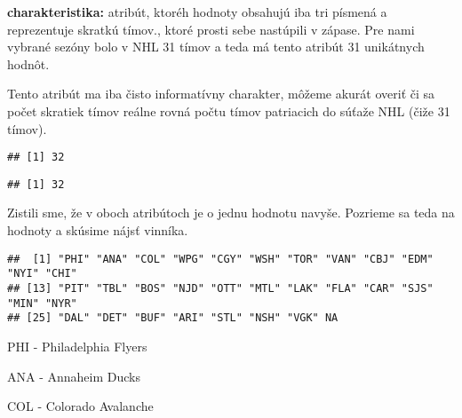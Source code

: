 \documentclass[
]{article}
\newenvironment{Shaded}{\begin{snugshade}}{\end{snugshade}}
\newcommand{\FunctionTok}[1]{\textcolor[rgb]{0.00,0.00,0.00}{#1}}
\newcommand{\NormalTok}[1]{#1}
\newcommand{\SpecialCharTok}[1]{\textcolor[rgb]{0.00,0.00,0.00}{#1}}
\begin{document}
\textbf{charakteristika:} atribút, ktoréh hodnoty obsahujú iba tri
písmená a reprezentuje skratkú tímov., ktoré prosti sebe nastúpili v
zápase. Pre nami vybrané sezóny bolo v NHL 31 tímov a teda má tento
atribút 31 unikátnych hodnôt.

Tento atribút ma iba čisto informatívny charakter, môžeme akurát overiť
či sa počet skratiek tímov reálne rovná počtu tímov patriacich do súťaže
NHL (čiže 31 tímov).

\begin{Shaded}
\end{Shaded}

\begin{verbatim}
## [1] 32
\end{verbatim}

\begin{Shaded}
\end{Shaded}

\begin{verbatim}
## [1] 32
\end{verbatim}

Zistili sme, že v oboch atribútoch je o jednu hodnotu navyše. Pozrieme
sa teda na hodnoty a skúsime nájsť vinníka.

\begin{Shaded}
\end{Shaded}

\begin{verbatim}
##  [1] "PHI" "ANA" "COL" "WPG" "CGY" "WSH" "TOR" "VAN" "CBJ" "EDM" "NYI" "CHI"
## [13] "PIT" "TBL" "BOS" "NJD" "OTT" "MTL" "LAK" "FLA" "CAR" "SJS" "MIN" "NYR"
## [25] "DAL" "DET" "BUF" "ARI" "STL" "NSH" "VGK" NA
\end{verbatim}

PHI - Philadelphia Flyers

ANA - Annaheim Ducks

COL - Colorado Avalanche
\end{document}
